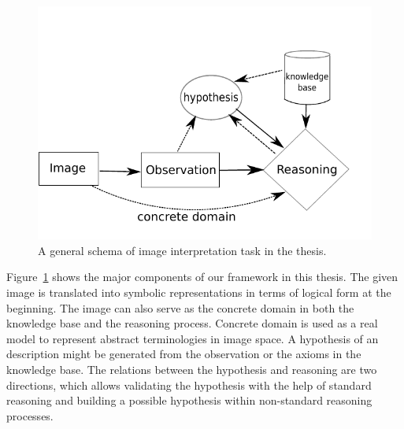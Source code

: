 \documentclass{article}
\begin{document}
  \begin{figure}[h]
  \centering
   \includegraphics[scale=.8]{./figures/intro_schema.pdf}
   \caption{\label{fig:intro_schema} A general schema of image interpretation task in the thesis.}
 \end{figure} 
Figure~\ref{fig:intro_schema} shows the major components of our framework in this thesis. The given image is translated into symbolic representations in terms of logical form at the beginning.
The image can also serve as the concrete domain in both the knowledge base and the reasoning process. 
Concrete domain is used as a real model to represent abstract terminologies in image space.
A hypothesis of an description might be generated from the observation or the axioms in the knowledge base.
The relations between the hypothesis and reasoning are two directions, which allows validating the hypothesis with the help of standard reasoning and
building a possible hypothesis within non-standard reasoning processes.
\end{document}
